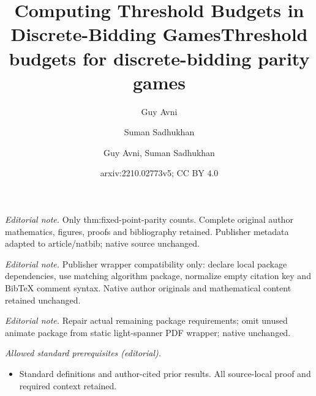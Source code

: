 \documentclass{article}\providecommand{\nequiv}{\not\equiv}\usepackage[a4paper,margin=20mm]{geometry}
\title{Computing Threshold Budgets in Discrete-Bidding Games}
\author{Guy Avni \and Suman Sadhukhan}\date{}
\title{Threshold budgets for discrete-bidding parity games}
\author{Guy Avni, Suman Sadhukhan}
\date{arxiv:2210.02773v5; CC BY 4.0}
\begin{document}
\maketitle
\noindent\textit{Editorial note.} Only thm:fixed-point-parity counts. Complete original author mathematics, figures, proofs and bibliography retained. Publisher metadata adapted to article/natbib; native source unchanged.\par\medskip
\noindent\textit{Editorial note.} Publisher wrapper compatibility only: declare local package dependencies, use matching algorithm package, normalize empty citation key and BibTeX comment syntax. Native author originals and mathematical content retained unchanged.\par\medskip
\noindent\textit{Editorial note.} Repair actual remaining package requirements; omit unused animate package from static light-spanner PDF wrapper; native unchanged.\par\medskip
\noindent\textit{Allowed standard prerequisites (editorial).}\begin{itemize}
\item Standard definitions and author-cited prior results. All source-local proof and required context retained.
\end{itemize}\medskip
\maketitle
\end{document}
